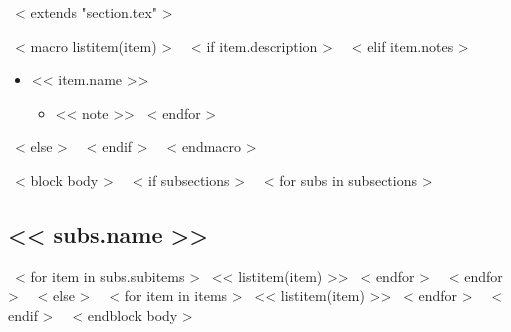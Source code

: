 ~< extends "section.tex" >~

~< macro listitem(item) >~
  ~< if item.description >~
  ~< elif item.notes >~
    \begin{itemize}
      \item{<< item.name >>}
      \begin{itemize}
      ~< for note in item.notes >~
        \item{<< note >>}
      ~< endfor >~
      \end{itemize}
    \end{itemize}
  ~< else >~
  ~< endif >~
~< endmacro >~

~< block body >~
  ~< if subsections >~
    ~< for subs in subsections >~
      \subsection{<< subs.name >>}
        ~< for item in subs.subitems >~
          << listitem(item) >>
        ~< endfor >~
    ~< endfor >~
  ~< else >~
    ~< for item in items >~
      << listitem(item) >>
    ~< endfor >~
  ~< endif >~
~< endblock body >~
